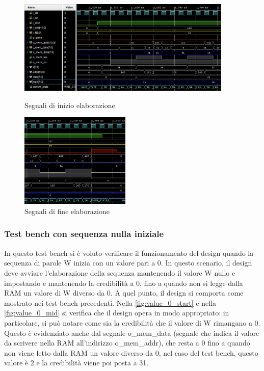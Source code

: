 \documentclass[11pt,a4paper]{article}
\newcommand{\m}[1]{{\scriptsize\fontfamily{fvm}\selectfont #1}}
\begin{document}
\vspace{0.5em}
\begin{figure}[htbp]
    \centering
    \begin{minipage}{0.6\textwidth}
        \centering
        \includegraphics[height=4.5cm]{resources/cred_0_start.png}
        \caption{Segnali di inizio elaborazione}
        \label{fig:cred_0_start}
    \end{minipage}\hfill
    \begin{minipage}{0.4\textwidth}
        \centering
        \includegraphics[height=4.5cm]{resources/cred_0_end.png}
        \caption{Segnali di fine elaborazione}
        \label{fig:cred_0_end}
    \end{minipage}
    \label{fig:cred_0_sequence}
\end{figure}
\subsubsection{Test bench con sequenza nulla iniziale}

In questo test bench si è voluto verificare il funzionamento del design quando la sequenza di parole \m{W} inizia con un valore pari a 0. In questo scenario, il design deve avviare l'elaborazione della sequenza mantenendo il valore \m{W} nullo e impostando e mantenendo la credibilità a 0, fino a quando non si legge dalla RAM un valore di \m{W} diverso da 0. A quel punto, il design si comporta come mostrato nei test bench precedenti. Nella \autoref{fig:value_0_start} e nella \autoref{fig:value_0_mid} si verifica che il design opera in modo appropriato: in particolare, si può notare come sia la credibilità che il valore di \m{W} rimangano a 0. Questo è evidenziato anche dal segnale \m{o\_mem\_data} (segnale che indica il valore da scrivere nella RAM all'indirizzo \m{o\_mem\_addr}), che resta a 0 fino a quando non viene letto dalla RAM un valore diverso da 0; nel caso del test bench, questo valore è 2 e la credibilità viene poi posta a 31.
\end{document}
